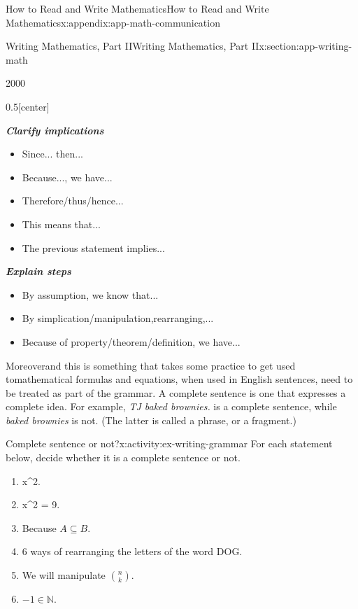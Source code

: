 \documentclass[oneside,10pt,]{book}
\newcommand{\alert}[1]{\textbf{\textit{#1}}}
\numberwithin{equation}{section}
\begin{document}
\begin{appendixptx}{How to Read and Write Mathematics}{}{How to Read and Write Mathematics}{}{}{x:appendix:app-math-communication}
\begin{sectionptx}{Writing Mathematics, Part II}{}{Writing Mathematics, Part II}{}{}{x:section:app-writing-math}
\begin{sidebyside}{2}{0}{0}{0}
\begin{sbspanel}{0.5}[center]%
\par
\alert{Clarify implications}%
\begin{itemize}[label=\textbullet]
\item{}Since... then...%
\item{}Because..., we have...%
\item{}Therefore\slash{}thus\slash{}hence...%
\item{}This means that...%
\item{}The previous statement implies...%
\end{itemize}
%
\end{sbspanel}%
\end{sidebyside}%
\par
\alert{Explain steps}%
\begin{itemize}[label=\textbullet]
\item{}By assumption, we know that...%
\item{}By simplication\slash{}manipulation,rearranging,...%
\item{}Because of property\slash{}theorem\slash{}definition, we have...%
\end{itemize}
%
\par
Moreover\textemdash{}and this is something that takes some practice to get used to\textemdash{}mathematical formulas and equations, when used in English sentences, need to be treated as part of the grammar. A complete sentence is one that expresses a complete idea. For example, \emph{TJ baked brownies.} is a complete sentence, while \emph{baked brownies} is not. (The latter is called a phrase, or a fragment.)%
\begin{activity}{Complete sentence or not?}{x:activity:ex-writing-grammar}%
For each statement below, decide whether it is a complete sentence or not.%
\par
%
\begin{enumerate}[label=(\alph*)]
\item{}x\textasciicircum{}2.%
\item{}x\textasciicircum{}2 = 9.%
\item{}Because \(A \subseteq B\).%
\item{}6 ways of rearranging the letters of the word DOG.%
\item{}We will manipulate \(\binom{n}{k}\).%
\item{}\(-1 \in \mathbb{N}\).%
\end{enumerate}
%
\end{activity}%

\end{sectionptx}
\end{appendixptx}
\end{document}
